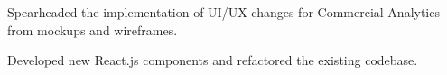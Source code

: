 \documentclass[]{deedy-resume-openfont}
\begin{document}
\begin{minipage}[t]{0.66\textwidth}
\begin{tightemize}
\item Spearheaded the implementation of UI/UX changes for Commercial Analytics from mockups and wireframes.
\item Developed new React.js components and refactored the existing codebase.
\end{tightemize}
\sectionsep








\end{minipage}
\end{document}
